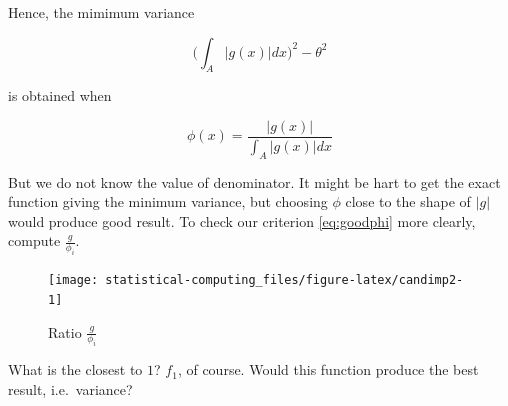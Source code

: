 \documentclass[]{book}
\newenvironment{Shaded}{\begin{snugshade}}{\end{snugshade}}
\newcommand{\DataTypeTok}[1]{\textcolor[rgb]{0.13,0.29,0.53}{#1}}
\newcommand{\DecValTok}[1]{\textcolor[rgb]{0.00,0.00,0.81}{#1}}
\newcommand{\FloatTok}[1]{\textcolor[rgb]{0.00,0.00,0.81}{#1}}
\newcommand{\KeywordTok}[1]{\textcolor[rgb]{0.13,0.29,0.53}{\textbf{#1}}}
\newcommand{\NormalTok}[1]{#1}
\newcommand{\OperatorTok}[1]{\textcolor[rgb]{0.81,0.36,0.00}{\textbf{#1}}}
\newcommand{\StringTok}[1]{\textcolor[rgb]{0.31,0.60,0.02}{#1}}
\theoremstyle{definition}
\theoremstyle{definition}
\theoremstyle{definition}
\theoremstyle{remark}
\begin{document}
Hence, the mimimum variance

\[\bigg( \int_A \lvert g(x) \rvert dx \bigg)^2 - \theta^2\]

is obtained when

\[\phi(x) = \frac{\lvert g(x) \rvert}{\int_A \lvert g(x) \rvert dx}\]

But we do not know the value of denominator. It might be hart to get the exact function giving the minimum variance, but choosing \(\phi\) close to the shape of \(\lvert g \rvert\) would produce good result. To check our criterion \eqref{eq:goodphi} more clearly, compute \(\frac{g}{\phi_i}\).

\begin{Shaded}
\end{Shaded}

\begin{figure}[H]

{\centering \texttt{[image: statistical-computing\_files/figure-latex/candimp2-1]} 

}

\caption{Ratio $\frac{g}{\phi_i}$}\label{fig:candimp2}
\end{figure}

What is the closest to \(1\)? \(f_1\), of course. Would this function produce the best result, i.e.~variance?
\end{document}

